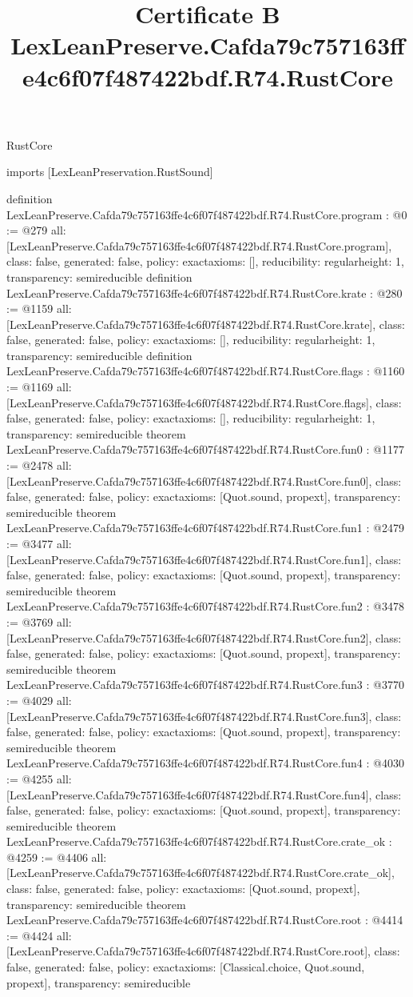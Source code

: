 \begin{lexlean}{RustCore}
\title{Certificate B LexLeanPreserve.Cafda79c757163ffe4c6f07f487422bdf.R74.RustCore}
\begin{coremodule}
imports [LexLeanPreservation.RustSound]

definition LexLeanPreserve.Cafda79c757163ffe4c6f07f487422bdf.R74.RustCore.program : @0 := @279 {
  all: [LexLeanPreserve.Cafda79c757163ffe4c6f07f487422bdf.R74.RustCore.program],
  class: false,
  generated: false,
  policy: exact{axioms: []},
  reducibility: regular{height: 1},
  transparency: semireducible
}
definition LexLeanPreserve.Cafda79c757163ffe4c6f07f487422bdf.R74.RustCore.krate : @280 := @1159 {
  all: [LexLeanPreserve.Cafda79c757163ffe4c6f07f487422bdf.R74.RustCore.krate],
  class: false,
  generated: false,
  policy: exact{axioms: []},
  reducibility: regular{height: 1},
  transparency: semireducible
}
definition LexLeanPreserve.Cafda79c757163ffe4c6f07f487422bdf.R74.RustCore.flags : @1160 := @1169 {
  all: [LexLeanPreserve.Cafda79c757163ffe4c6f07f487422bdf.R74.RustCore.flags],
  class: false,
  generated: false,
  policy: exact{axioms: []},
  reducibility: regular{height: 1},
  transparency: semireducible
}
theorem LexLeanPreserve.Cafda79c757163ffe4c6f07f487422bdf.R74.RustCore.fun0 : @1177 := @2478 {
  all: [LexLeanPreserve.Cafda79c757163ffe4c6f07f487422bdf.R74.RustCore.fun0],
  class: false,
  generated: false,
  policy: exact{axioms: [Quot.sound, propext]},
  transparency: semireducible
}
theorem LexLeanPreserve.Cafda79c757163ffe4c6f07f487422bdf.R74.RustCore.fun1 : @2479 := @3477 {
  all: [LexLeanPreserve.Cafda79c757163ffe4c6f07f487422bdf.R74.RustCore.fun1],
  class: false,
  generated: false,
  policy: exact{axioms: [Quot.sound, propext]},
  transparency: semireducible
}
theorem LexLeanPreserve.Cafda79c757163ffe4c6f07f487422bdf.R74.RustCore.fun2 : @3478 := @3769 {
  all: [LexLeanPreserve.Cafda79c757163ffe4c6f07f487422bdf.R74.RustCore.fun2],
  class: false,
  generated: false,
  policy: exact{axioms: [Quot.sound, propext]},
  transparency: semireducible
}
theorem LexLeanPreserve.Cafda79c757163ffe4c6f07f487422bdf.R74.RustCore.fun3 : @3770 := @4029 {
  all: [LexLeanPreserve.Cafda79c757163ffe4c6f07f487422bdf.R74.RustCore.fun3],
  class: false,
  generated: false,
  policy: exact{axioms: [Quot.sound, propext]},
  transparency: semireducible
}
theorem LexLeanPreserve.Cafda79c757163ffe4c6f07f487422bdf.R74.RustCore.fun4 : @4030 := @4255 {
  all: [LexLeanPreserve.Cafda79c757163ffe4c6f07f487422bdf.R74.RustCore.fun4],
  class: false,
  generated: false,
  policy: exact{axioms: [Quot.sound, propext]},
  transparency: semireducible
}
theorem LexLeanPreserve.Cafda79c757163ffe4c6f07f487422bdf.R74.RustCore.crate_ok : @4259 := @4406 {
  all: [LexLeanPreserve.Cafda79c757163ffe4c6f07f487422bdf.R74.RustCore.crate_ok],
  class: false,
  generated: false,
  policy: exact{axioms: [Quot.sound, propext]},
  transparency: semireducible
}
theorem LexLeanPreserve.Cafda79c757163ffe4c6f07f487422bdf.R74.RustCore.root : @4414 := @4424 {
  all: [LexLeanPreserve.Cafda79c757163ffe4c6f07f487422bdf.R74.RustCore.root],
  class: false,
  generated: false,
  policy: exact{axioms: [Classical.choice, Quot.sound, propext]},
  transparency: semireducible
}


\end{coremodule}
\end{lexlean}
